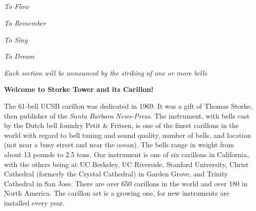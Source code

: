 \documentclass[11pt, letterpaper]{article}
\begin{document}
\begin{center}
    {\departmenthead} \\[1em]
    {\Large \recitaltype} \\[.5em]
    {\Large \textbf{\theperformers}} \\[.5em]
    {\small \thedatetimeplace} \\[1em]
\end{center}


\vspace{1em}

\newcommand{\motif}[1]{\item[] {\centering \textit{#1} \par\vspace{-.5em}}}

\begin{programlist}
    \motif{To Flow}
    \item


    \motif{To Remember}
    \item


    \motif{To Sing}
    \item

    \motif{To Dream}
    \item
\end{programlist}

\vspace{2em}

\begin{center}
    \small \it Each section will be announced by the striking of one or more bells
\end{center}

\hrulefill

\textbf{Welcome to Storke Tower and its Carillon!}

{\small
    The 61-bell UCSB carillon was dedicated in 1969. It was a gift of Thomas Storke, then publisher of the \textit{Santa Barbara News-Press}. The instrument, with bells cast by the Dutch bell foundry Petit \& Fritsen, is one of the finest carillons in the world with regard to bell tuning and sound quality, number of bells, and location (not near a busy street and near the ocean). The bells range in weight from about 13 pounds to 2.5 tons.
    Our instrument is one of six carillons in California, with the others being at UC Berkeley, UC Riverside, Stanford University, Christ Cathedral (formerly the Crystal Cathedral) in Garden Grove, and Trinity Cathedral in San Jose. There are over 650 carillons in the world and over 180 in North America. The carillon art is a growing one, for new instruments are installed every year. \par
}
\end{document}
